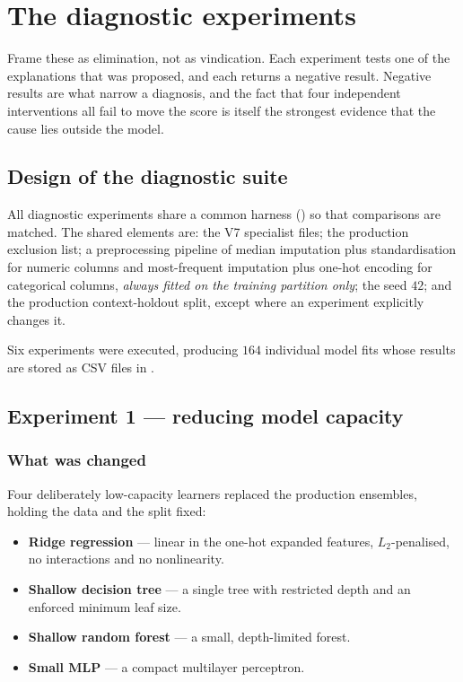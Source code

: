 \chapter{The diagnostic experiments}
\label{ch:diagnostics}

\begin{saybox}[title=What to say at the start of this section]
Frame these as elimination, not as vindication. Each experiment tests one
of the explanations that was proposed, and each returns a negative result.
Negative results are what narrow a diagnosis, and the fact that four
independent interventions all fail to move the score is itself the
strongest evidence that the cause lies outside the model.
\end{saybox}

\section{Design of the diagnostic suite}

All diagnostic experiments share a common harness
() so that comparisons
are matched. The shared elements are: the V7 specialist files; the
production exclusion list; a preprocessing pipeline of median imputation
plus standardisation for numeric columns and most-frequent imputation plus
one-hot encoding for categorical columns, \emph{always fitted on the
training partition only}; the seed $42$; and the production context-holdout
split, except where an experiment explicitly changes it.

Six experiments were executed, producing $164$ individual model fits whose
results are stored as CSV files in
.

\section{Experiment 1 --- reducing model capacity}

\subsection{What was changed}

Four deliberately low-capacity learners replaced the production ensembles,
holding the data and the split fixed:

\begin{itemize}[leftmargin=1.3em, itemsep=1pt]
\item \textbf{Ridge regression} --- linear in the one-hot expanded
  features, $L_2$-penalised, no interactions and no nonlinearity.
\item \textbf{Shallow decision tree} --- a single tree with restricted
  depth and an enforced minimum leaf size.
\item \textbf{Shallow random forest} --- a small, depth-limited forest.
\item \textbf{Small MLP} --- a compact multilayer perceptron.
\end{itemize}

